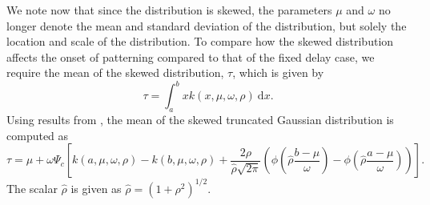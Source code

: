 We note now that since the distribution is skewed, the parameters $\mu$ and $\omega$ no longer denote the mean and standard deviation of the distribution, but solely the location and scale of the distribution. To compare how the skewed distribution affects the onset of patterning compared to that of the fixed delay case, we require the mean of the skewed distribution, $\tau$, which is given by
\begin{equation}
    \tau=\int_a^bxk(x,\mu,\omega,\rho)\ \text{d}x.
\end{equation}
Using results from \cite{skewed}, the mean of the skewed truncated Gaussian distribution is computed as
\begin{equation}
\tau=\mu+\omega\Psi_c\left[k(a,\mu,\omega,\rho)-k(b,\mu,\omega,\rho)+\frac{2\rho}{\hat{\rho}\sqrt{2\pi}}\left(\phi\left(\hat{\rho}\frac{b-\mu}{\omega}\right)-\phi\left(\hat{\rho}\frac{a-\mu}{\omega}\right)\right)\right].
\end{equation}
The scalar $\hat{\rho}$ is given as $\hat{\rho}=\left(1+\rho^2\right)^{1/2}$.
